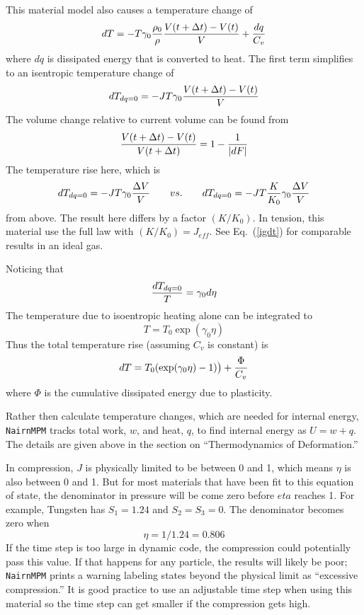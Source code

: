 \documentclass[11pt]{book}
\def\Jeff{J_{eff}}
\begin{document}
This material model also causes a temperature change of
\begin{equation}
     dT = - T \gamma_0 {\rho_0\over \rho} {V(t+\Delta t)-V(t)\over V} + {dq \over C_v}
\end{equation}
where $dq$ is dissipated energy that is converted to heat. The first term simplifies to an isentropic temperature change of
\begin{equation}
     dT_{dq=0} = - JT \gamma_0  {V(t+\Delta t)-V(t)\over V} 
\end{equation}
The volume change relative to current volume can be found from
\begin{equation}
     {V(t+\Delta t)-V(t)\over V(t+\Delta t)} =1 - {1\over |dF|}
\end{equation}
The temperature rise here, which is
\begin{equation}
     dT_{dq=0} = - J T\gamma_0 {\Delta V\over V}    \qquad vs. \qquad  dT_{dq=0} = -JT  {K\over K_0} \gamma_0 {\Delta V\over V}     \label{mgdt}
\end{equation}
from above. The result here differs by a factor $(K/K_0)$. In tension, this material use the full law with $(K/K_0) = \Jeff$. See Eq.~(\ref{igdt}) for comparable results in an ideal gas.

Noticing that
\begin{equation}
     {dT_{dq=0}\over T} =   \gamma_0  d\eta
\end{equation}
The temperature due to isoentropic heating alone can be integrated to
\begin{equation}
     T = T_0\exp( \gamma_0  \eta)
\end{equation}
Thus the total temperature rise (assuming $C_v$ is constant) is
\begin{equation}
      dT = T_0(\exp( \gamma_0  \eta)-1)\bigr) + {\Phi\over C_v}
\end{equation}
where $\Phi$ is the cumulative dissipated energy due to plasticity.

Rather then calculate temperature changes, which are needed for internal energy, {\tt NairnMPM} tracks total work, $w$, and heat, $q$, to find internal energy as $U = w+q$. The details are given above in the section on ``Thermodynamics of Deformation.''

In compression, $J$ is physically limited to be between 0 and 1, which means $\eta$ is also between 0 and 1. But for most materials that have been fit to this equation of state, the denominator in pressure will be come zero before $eta$ reaches 1. For example, Tungsten has $S_1=1.24$ and $S_2=S_3=0$. The denominator becomes zero when
\begin{equation}
     \eta = 1/1.24 = 0.806
\end{equation}
If the time step is too large in dynamic code, the compression could potentially pass this value. If that happens for any particle, the results will likely be poor; {\tt NairnMPM} prints a warning labeling states beyond the physical limit as ``excessive compression.'' It is good practice to use an adjustable time step when using this material so the time step can get smaller if the compression gets high.
\end{document}
